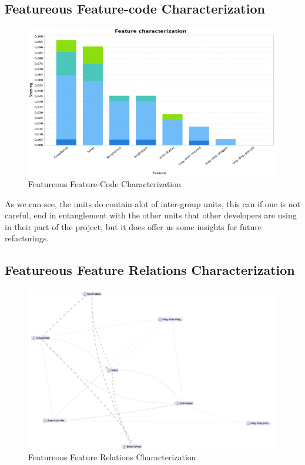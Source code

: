 \subsection{Featureous Feature-code Characterization}

\begin{figure}[H]
    \centering
    \includegraphics[width=\linewidth]{pic/Featureous Feature-Code Characterization.png}
    \caption{Featureous Feature-Code Characterization}
    \label{fig:Featureous Feature-Code Characterization}
\end{figure}

As we can see, the units do contain alot of inter-group units, this can if one is not careful, end in entanglement with the other units that other developers
are using in their part of the project, but it does offer us some insights for future refactorings.

\subsection{Featureous Feature Relations Characterization}

\begin{figure}[H]
    \centering
    \includegraphics[width=\linewidth]{pic/Feature Relations Characterization.png}
    \caption{Featureous Feature Relations Characterization}
    \label{fig:Featureous Feature Relations Characterization}
\end{figure}


